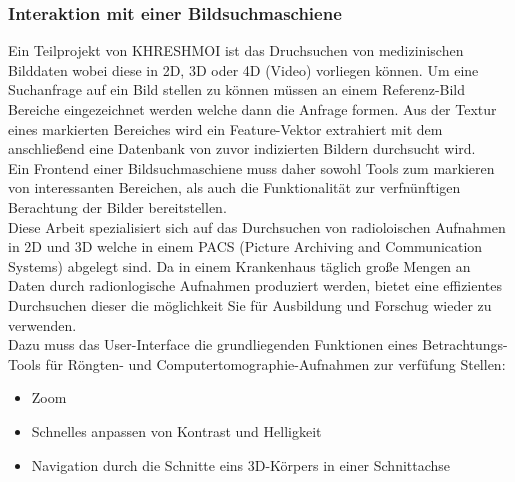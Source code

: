 \subsubsection{Interaktion mit einer Bildsuchmaschiene}
\label{sec:Interaktion mit einer Bildsuchmaschiene}
Ein Teilprojekt von KHRESHMOI ist das Druchsuchen von medizinischen Bilddaten wobei diese in 2D, 3D oder 4D (Video) vorliegen können.
Um eine Suchanfrage auf ein Bild stellen zu können müssen an einem Referenz-Bild Bereiche eingezeichnet werden welche dann die Anfrage formen.
Aus der Textur eines markierten Bereiches wird ein Feature-Vektor extrahiert mit dem anschließend eine Datenbank von zuvor indizierten Bildern durchsucht wird.
\\
Ein Frontend einer Bildsuchmaschiene muss daher sowohl Tools zum markieren von interessanten Bereichen, 
als auch die Funktionalität zur verfnünftigen Berachtung der Bilder bereitstellen.
\cite{kres}
\\
Diese Arbeit spezialisiert sich auf das Durchsuchen von radioloischen Aufnahmen in 2D und 3D welche in einem PACS (Picture Archiving and Communication Systems) abgelegt sind.
Da in einem Krankenhaus täglich große Mengen an Daten durch radionlogische Aufnahmen produziert werden, 
bietet eine effizientes Durchsuchen dieser die möglichkeit Sie für Ausbildung und Forschug wieder zu verwenden.
\\
Dazu muss das User-Interface die grundliegenden Funktionen eines Betrachtungs-Tools für Röngten- und Computertomographie-Aufnahmen zur verfüfung Stellen:
\begin{itemize}
	\item Zoom
	\item Schnelles anpassen von Kontrast und Helligkeit
	\item Navigation durch die Schnitte eins 3D-Körpers in einer Schnittachse
\end{itemize}


